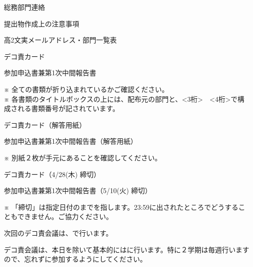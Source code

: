 \pagestyle{empty}

\begin{multicols*}{2}
\setlength{\columnseprule}{0pt}
\begin{enumsquarebrackets}
    \item 総務部門連絡
    \item 提出物作成上の注意事項
    \item 高2文実メールアドレス・部門一覧表
    \item デコ責カード
    \item 参加申込書兼第1次中間報告書
\end{enumsquarebrackets}
※ 全ての書類が折り込まれているかご確認ください。\\
\noindent ※ 各書類のタイトルボックスの上には、配布元の部門と、<3桁>~\boldtext{-}~<4桁>で構成される書類番号が記されています。

\begin{enumsquarebrackets}
    \item デコ責カード（解答用紙）
    \item 参加申込書兼第1次中間報告書（解答用紙）
\end{enumsquarebrackets}
※ 別紙２枚が手元にあることを確認してください。

\newcolumn
{}
\begin{enumsquarebrackets}
    \item デコ責カード（4/28(木) 締切）
    \item 参加申込書兼第1次中間報告書（5/10(火) 締切）
\end{enumsquarebrackets}
※ 「締切」は指定日付のまでを指します。23:59に出されたところでどうすることもできません。ご協力ください。

\begin{reitemize}
    \item 次回のデコ責会議は、で行います。
    \item デコ責会議は、本日を除いて基本的にはに行います。特に２学期は毎週行いますので、忘れずに参加するようにしてください。
\end{reitemize}

\end{multicols*}